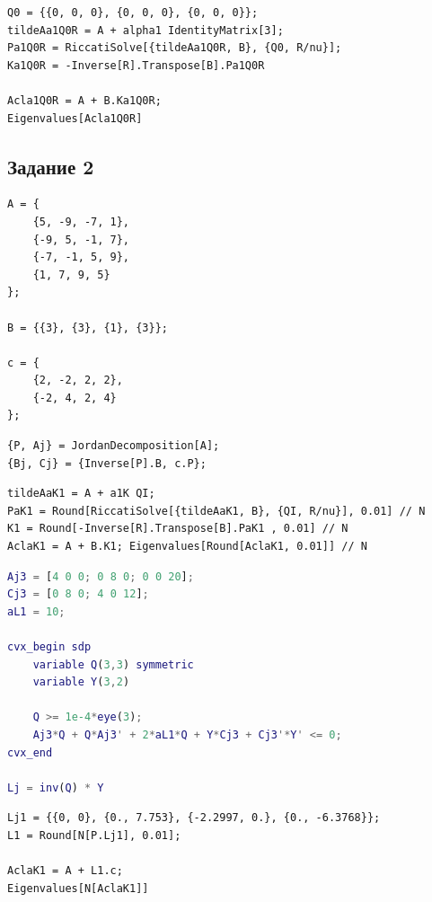 \documentclass[a4paper,12pt]{article}
\begin{document}
\begin{lstlisting}[caption={Решение матричного уравнения Риккати при \(Q = 0_{3\times3}\)}, label={lst:riccati0}]
Q0 = {{0, 0, 0}, {0, 0, 0}, {0, 0, 0}};
tildeAa1Q0R = A + alpha1 IdentityMatrix[3];
Pa1Q0R = RiccatiSolve[{tildeAa1Q0R, B}, {Q0, R/nu}];
Ka1Q0R = -Inverse[R].Transpose[B].Pa1Q0R

Acla1Q0R = A + B.Ka1Q0R;
Eigenvalues[Acla1Q0R]
\end{lstlisting}
	
	
\newpage \subsection*{Задание 2}

\begin{lstlisting}[caption={Инициализация}]
A = {
	{5, -9, -7, 1}, 
	{-9, 5, -1, 7},
	{-7, -1, 5, 9},
	{1, 7, 9, 5}
};

B = {{3}, {3}, {1}, {3}};

c = {
	{2, -2, 2, 2}, 
	{-2, 4, 2, 4}
};
\end{lstlisting}

\begin{lstlisting}[caption={Переход в жорданов базис}, label={lst:jordan2}]
{P, Aj} = JordanDecomposition[A];
{Bj, Cj} = {Inverse[P].B, c.P};
\end{lstlisting}
	
\begin{lstlisting}[caption={Синтез регулятора \(K\)}, label={lst:K21}]
tildeAaK1 = A + a1K QI;
PaK1 = Round[RiccatiSolve[{tildeAaK1, B}, {QI, R/nu}], 0.01] // N
K1 = Round[-Inverse[R].Transpose[B].PaK1 , 0.01] // N
AclaK1 = A + B.K1; Eigenvalues[Round[AclaK1, 0.01]] // N
\end{lstlisting}

\begin{lstlisting}[caption={Синтез наблюдателя \(L\)}, label={lst:L21}, language=Matlab]
Aj3 = [4 0 0; 0 8 0; 0 0 20];
Cj3 = [0 8 0; 4 0 12];
aL1 = 10;

cvx_begin sdp
	variable Q(3,3) symmetric
	variable Y(3,2)
	
	Q >= 1e-4*eye(3);
	Aj3*Q + Q*Aj3' + 2*aL1*Q + Y*Cj3 + Cj3'*Y' <= 0;
cvx_end

Lj = inv(Q) * Y
\end{lstlisting}

\begin{lstlisting}[caption={Переход в исходный базис}, label={lst:L22}]
Lj1 = {{0, 0}, {0., 7.753}, {-2.2997, 0.}, {0., -6.3768}};
L1 = Round[N[P.Lj1], 0.01];

AclaK1 = A + L1.c;
Eigenvalues[N[AclaK1]]
\end{lstlisting}
\end{document}
